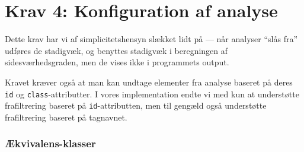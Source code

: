 \documentclass[a4paper,oneside,article]{memoir}
\begin{document}
\section{Krav 4: Konfiguration af analyse}

Dette krav har vi af simplicitetshensyn slækket lidt på --- når
analyser ``slås fra'' udføres de stadigvæk, og benyttes stadigvæk i
beregningen af sidesværhedsgraden, men de vises ikke i programmets
output.

Kravet kræver også at man kan undtage elementer fra analyse baseret på
deres \texttt{id} og \texttt{class}-attributter. I vores
implementation endte vi med kun at understøtte frafiltrering baseret
på \texttt{id}-attributten, men til gengæld også understøtte
frafiltrering baseret på tagnavnet.

\subsubsection{Ækvivalens-klasser}
\end{document}
